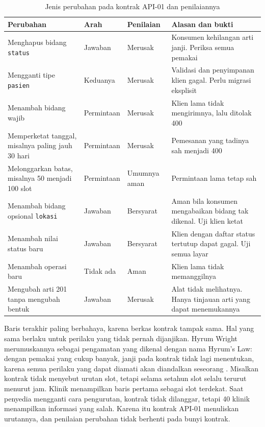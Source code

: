\begin{table}[!htb]
  \centering
  \caption{Jenis perubahan pada kontrak API-01 dan penilaiannya}
  \label{tab:ch09-perubahan}
  \footnotesize
  \begin{tabularx}{\textwidth}{GH{1.5cm}H{1.6cm}G}
    \hline
    \textbf{Perubahan} & \textbf{Arah} & \textbf{Penilaian} & \textbf{Alasan dan bukti} \\ \hline
    Menghapus bidang \texttt{status} & Jawaban & Merusak & Konsumen kehilangan arti janji. Periksa semua pemakai \\ \hline
    Mengganti tipe \texttt{pasien} & Keduanya & Merusak & Validasi dan penyimpanan klien gagal. Perlu migrasi eksplisit \\ \hline
    Menambah bidang wajib & Permintaan & Merusak & Klien lama tidak mengirimnya, lalu ditolak 400 \\ \hline
    Memperketat tanggal, misalnya paling jauh 30 hari & Permintaan & Merusak & Pemesanan yang tadinya sah menjadi 400 \\ \hline
    Melonggarkan batas, misalnya 50 menjadi 100 slot & Permintaan & Umumnya aman & Permintaan lama tetap sah \\ \hline
    Menambah bidang opsional \texttt{lokasi} & Jawaban & Bersyarat & Aman bila konsumen mengabaikan bidang tak dikenal. Uji klien ketat \\ \hline
    Menambah nilai status baru & Jawaban & Bersyarat & Klien dengan daftar status tertutup dapat gagal. Uji semua layar \\ \hline
    Menambah operasi baru & Tidak ada & Aman & Klien lama tidak memanggilnya \\ \hline
    Mengubah arti 201 tanpa mengubah bentuk & Jawaban & Merusak & Alat tidak melihatnya. Hanya tinjauan arti yang dapat menemukannya \\ \hline
  \end{tabularx}
\end{table}

Baris terakhir paling berbahaya, karena berkas kontrak tampak sama. Hal yang sama berlaku untuk perilaku yang tidak pernah dijanjikan. Hyrum Wright merumuskannya sebagai pengamatan
yang dikenal dengan nama Hyrum's Law: dengan pemakai yang cukup banyak, janji pada kontrak tidak lagi menentukan, karena semua perilaku yang dapat diamati akan diandalkan seseorang
\cite{c09-hyrum}. Misalkan kontrak tidak menyebut urutan slot, tetapi selama setahun slot selalu terurut menurut jam. Klinik menampilkan baris pertama sebagai slot terdekat. Saat
penyedia mengganti cara pengurutan, kontrak tidak dilanggar, tetapi 40 klinik menampilkan informasi yang salah. Karena itu kontrak API-01 menuliskan urutannya, dan penilaian perubahan
tidak berhenti pada bunyi kontrak.

